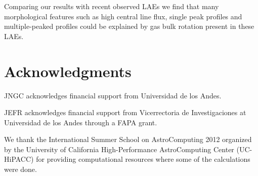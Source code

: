 \documentclass{emulateapj}
\begin{document}
Comparing our results with recent observed LAEs we find that many 
morphological features such as high central line flux, single peak
profiles and multiple-peaked profiles could be explained by gas bulk 
rotation present in these LAEs.


\section*{Acknowledgments}

JNGC acknowledges financial support from Universidad de los
Andes. 

JEFR acknowledges financial support from Vicerrectoria de
Investigaciones at Universidad de los Andes through a FAPA grant.

We thank the International Summer School on AstroComputing
2012 organized by the University of California High-Performance
AstroComputing Center (UC-HiPACC) for providing computational
resources where some of the calculations were done. 





 
\end{document}

